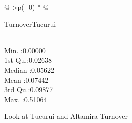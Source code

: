 \documentclass[
]{article}
\begin{document}
\begin{longtable}[]{@{}
  >{\centering\arraybackslash}p{(\columnwidth - 0\tabcolsep) * }@{}}
\toprule\noalign{}
\begin{minipage}[b]{\linewidth}\centering
TurnoverTucurui
\end{minipage} \\
\midrule\noalign{}
\endhead
\bottomrule\noalign{}
\endlastfoot
Min. :0.00000 \\
1st Qu.:0.02638 \\
Median :0.05622 \\
Mean :0.07442 \\
3rd Qu.:0.09877 \\
Max. :0.51064 \\
\end{longtable}

Look at Tucurui and Altamira Turnover
\end{document}
